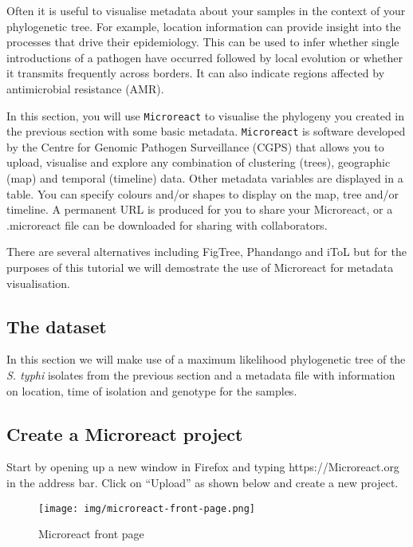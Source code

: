 \documentclass[11pt]{article}
\begin{document}
Often it is useful to visualise metadata about your samples in the
context of your phylogenetic tree. For example, location information can
provide insight into the processes that drive their epidemiology. This
can be used to infer whether single introductions of a pathogen have
occurred followed by local evolution or whether it transmits frequently
across borders. It can also indicate regions affected by antimicrobial
resistance (AMR).

In this section, you will use \texttt{Microreact} to visualise the
phylogeny you created in the previous section with some basic metadata.
\texttt{Microreact} is software developed by the Centre for Genomic
Pathogen Surveillance (CGPS) that allows you to upload, visualise and
explore any combination of clustering (trees), geographic (map) and
temporal (timeline) data. Other metadata variables are displayed in a
table. You can specify colours and/or shapes to display on the map, tree
and/or timeline. A permanent URL is produced for you to share your
Microreact, or a .microreact file can be downloaded for sharing with
collaborators.

There are several alternatives including FigTree, Phandango and iToL but
for the purposes of this tutorial we will demostrate the use of
Microreact for metadata visualisation.

    \hypertarget{the-dataset}{%
\subsection{The dataset}\label{the-dataset}}

In this section we will make use of a maximum likelihood phylogenetic
tree of the \textit{S. typhi} isolates from the previous section and a
metadata file with information on location, time of isolation and
genotype for the samples.

    \hypertarget{create-a-microreact-project}{%
\subsection{Create a Microreact
project}\label{create-a-microreact-project}}

Start by opening up a new window in Firefox and typing
https://Microreact.org in the address bar. Click on ``Upload'' as shown
below and create a new project.

    \begin{figure}
\centering
\texttt{[image: img/microreact-front-page.png]}
\caption{Microreact front page}
\end{figure}
\end{document}
